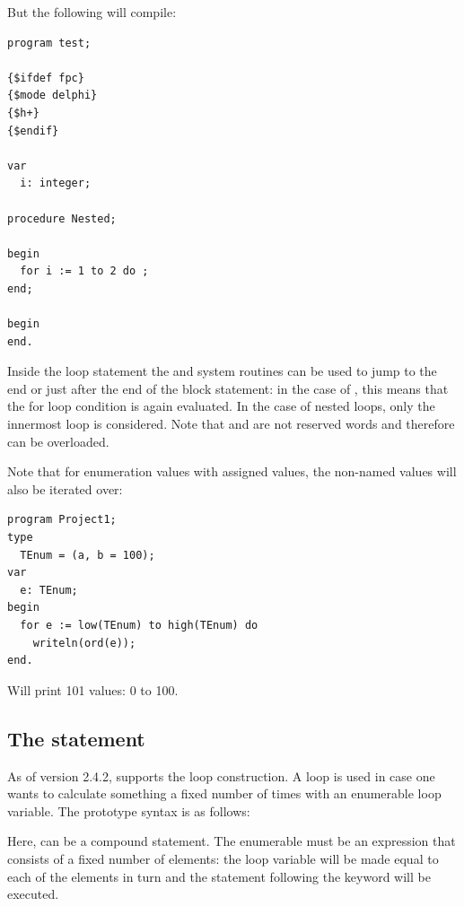 But the following will compile:
\begin{verbatim}
program test;

{$ifdef fpc}
{$mode delphi}
{$h+}
{$endif}

var
  i: integer;

procedure Nested;

begin
  for i := 1 to 2 do ;
end;

begin
end.
\end{verbatim}


Inside the loop statement the  and
 system routines can be used to jump to the end or just
after the end of the  block statement: in the case of
, this means that the for loop condition is again evaluated.
In the case of nested loops, only the innermost loop is considered.
Note that  and  are not reserved words and therefore can be overloaded.

Note that for enumeration values with assigned values, the non-named values
will also be iterated over:
\begin{verbatim}
program Project1;
type
  TEnum = (a, b = 100);
var
  e: TEnum;
begin
  for e := low(TEnum) to high(TEnum) do
    writeln(ord(e));
end.
\end{verbatim}
Will print 101 values: 0 to 100.

\subsection{The  statement}
\label{se:forin}
As of version 2.4.2, \fpc supports the  loop construction. A
 loop is used in case one wants to calculate something a fixed number of times
with an enumerable loop variable. The prototype syntax is as follows:

Here,  can be a compound statement. The enumerable must be an
expression that consists of a fixed number of elements: the loop variable
will be made equal to each of the elements in turn and the statement following the
 keyword will be executed.

